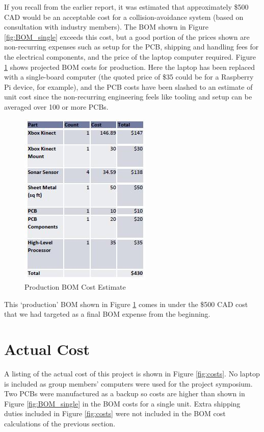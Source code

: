 \documentclass[oneside,final,a4paper]{report}
\begin{document}
If you recall from the earlier report, it was estimated that approximately \$500 CAD would be an acceptable cost for a collision-avoidance system (based on consultation with industry members). The BOM shown in Figure \ref{fig:BOM_single} exceeds this cost, but a good portion of the prices shown are non-recurring expenses such as setup for the PCB, shipping and handling fees for the electrical components, and the price of the laptop computer required. Figure \ref{fig:BOM_prod} shows  projected BOM costs for production. Here the laptop has been replaced with a single-board computer (the quoted price of \$35 could be for a Raspberry Pi device, for example), and the PCB costs have been slashed to an estimate of unit cost since the non-recurring engineering feels like tooling and setup can be averaged over 100 or more PCBs.

\begin{figure}[hbt]
 \centering
 \includegraphics[scale=1]{BOM_production}
 \caption{Production BOM Cost Estimate}
 \label{fig:BOM_prod}
\end{figure}

This `production' BOM shown in Figure \ref{fig:BOM_prod} comes in under the \$500 CAD cost that we had targeted as a final BOM expense from the beginning.


\section{Actual Cost}

A listing of the actual cost of this project is shown in Figure \ref{fig:costs}. No laptop is included as group members' computers were used for the project symposium. Two PCBs were manufactured as a backup so costs are higher than shown in Figure \ref{fig:BOM_single} in the BOM costs for a single unit. Extra shipping duties included in Figure \ref{fig:costs} were not included in the BOM cost calculations of the previous section.
\end{document}
